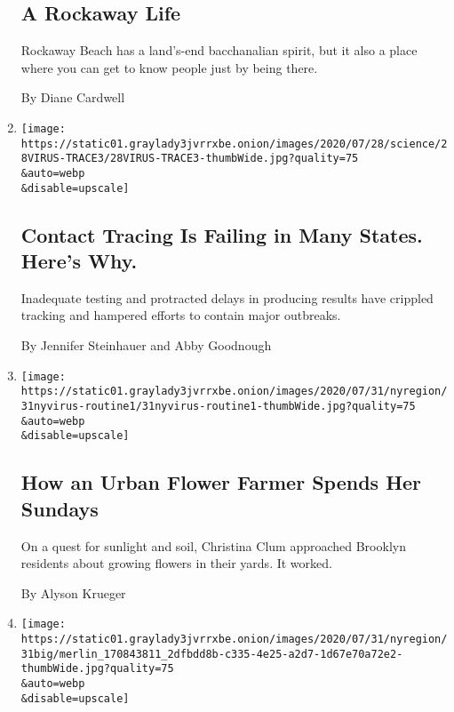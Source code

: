 \begin{enumerate}
  \hypertarget{a-rockaway-life}{%
  \subsection{A Rockaway Life}\label{a-rockaway-life}}

  Rockaway Beach has a land's-end bacchanalian spirit, but it also a
  place where you can get to know people just by being there.

  By Diane Cardwell
\item
  \href{/2020/07/31/health/covid-contact-tracing-tests.html}{}

  \texttt{[image: https://static01.graylady3jvrrxbe.onion/images/2020/07/28/science/28VIRUS-TRACE3/28VIRUS-TRACE3-thumbWide.jpg?quality=75\\\&auto=webp\\\&disable=upscale]}

  \hypertarget{contact-tracing-is-failing-in-many-states-heres-why}{%
  \subsection{Contact Tracing Is Failing in Many States. Here's
  Why.}\label{contact-tracing-is-failing-in-many-states-heres-why}}

  Inadequate testing and protracted delays in producing results have
  crippled tracking and hampered efforts to contain major outbreaks.

  By Jennifer Steinhauer and Abby Goodnough
\item
  \href{/2020/07/31/nyregion/urban-gardening-nyc.html}{}

  \texttt{[image: https://static01.graylady3jvrrxbe.onion/images/2020/07/31/nyregion/31nyvirus-routine1/31nyvirus-routine1-thumbWide.jpg?quality=75\\\&auto=webp\\\&disable=upscale]}

  \hypertarget{how-an-urban-flower-farmer-spends-her-sundays}{%
  \subsection{How an Urban Flower Farmer Spends Her
  Sundays}\label{how-an-urban-flower-farmer-spends-her-sundays}}

  On a quest for sunlight and soil, Christina Clum approached Brooklyn
  residents about growing flowers in their yards. It worked.

  By Alyson Krueger
\item
  \href{/2020/07/31/nyregion/ny-parole-violations.html}{}

  \texttt{[image: https://static01.graylady3jvrrxbe.onion/images/2020/07/31/nyregion/31big/merlin\_170843811\_2dfbdd8b-c335-4e25-a2d7-1d67e70a72e2-thumbWide.jpg?quality=75\\\&auto=webp\\\&disable=upscale]}


\end{enumerate}
